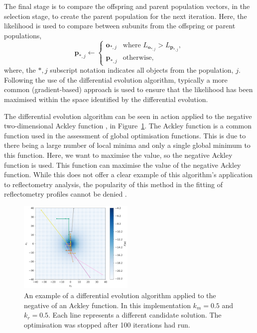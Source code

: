 \documentclass[
 reprint,
 superscriptaddress,
 amsmath,amssymb,
 aps,
]{revtex4-1}
\begin{document}
The final stage is to compare the offspring and parent population vectors, in the selection stage, to create the parent population for the next iteration.
Here, the likelihood is used to compare between subunits from the offspring or parent populations,
%
\begin{equation}
    \mathbf{p}_{*, j} \leftarrow
    \begin{cases}
        \mathbf{o}_{*, j} & \text{where } L_{\mathbf{o}_{*, j}} > L_{\mathbf{p}_{*, j}},\\
        \mathbf{p}_{*, j} & \text{otherwise},
    \end{cases}
\end{equation}
%
where, the $*, j$ subscript notation indicates all objects from the population, $j$.
Following the use of the differential evolution algorithm, typically a more common (gradient-based) approach is used to ensure that the likelihood has been maximised within the space identified by the differential evolution.

The differential evolution algorithm can be seen in action applied to the negative two-dimensional Ackley function \cite{ackley_connectionist_1987}, in Figure~\ref{fig:ackley}.
The Ackley function is a common function used in the assessment of global optimisation functions. This is due to there being a large number of local minima and only a single global minimum to this function. Here, we want to maximise the value, so the negative Ackley function is used.
This function can maximise the value of the negative Ackley function.
While this does not offer a clear example of this algorithm's application to reflectometry analysis, the popularity of this method in the fitting of reflectometry profiles cannot be denied \cite{bjorck_fitting_2011,nelson_refnx_2019}.
%
\begin{figure}[t]
    \includegraphics[width=0.49\textwidth]{ackley}
    \caption{An example of a differential evolution algorithm applied to the negative of an Ackley function. In this implementation $k_m=0.5$ and $k_r=0.5$. Each line represents a different candidate solution. The optimisation was stopped after 100 iterations had run.}
    \label{fig:ackley}
\end{figure}
%
\end{document}
